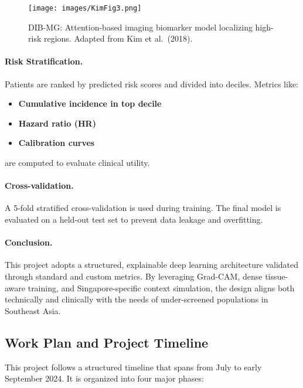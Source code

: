 \documentclass[12pt]{article}
\begin{document}
\begin{figure}[H]
    \centering
    \texttt{[image: images/KimFig3.png]}
    \caption{DIB-MG: Attention-based imaging biomarker model localizing high-risk regions. Adapted from Kim et al.\ (2018).}
    \label{fig:kim2018}
\end{figure}

\paragraph{Risk Stratification.}
Patients are ranked by predicted risk scores and divided into deciles. Metrics like:
\begin{itemize}
    \item \textbf{Cumulative incidence in top decile}
    \item \textbf{Hazard ratio (HR)}
    \item \textbf{Calibration curves}
\end{itemize}
are computed to evaluate clinical utility.

\paragraph{Cross-validation.}
A 5-fold stratified cross-validation is used during training. The final model is evaluated on a held-out test set to prevent data leakage and overfitting.

\vspace{1em}

\paragraph{Conclusion.}
This project adopts a structured, explainable deep learning architecture validated through standard and custom metrics. By leveraging Grad-CAM, dense tissue-aware training, and Singapore-specific context simulation, the design aligns both technically and clinically with the needs of under-screened populations in Southeast Asia.

\subsection{Work Plan and Project Timeline}

This project follows a structured timeline that spans from July to early September 2024. It is organized into four major phases:
\end{document}
